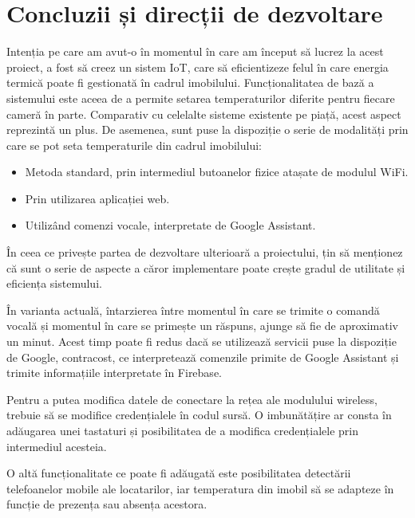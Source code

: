 \chapter{Concluzii și direcții de dezvoltare}\label{ch:5concluzii}

	Intenția pe care am avut-o în momentul în care am început să lucrez la acest proiect, a fost să creez un sistem IoT, care să eficientizeze felul în care energia termică poate fi gestionată în cadrul imobilului. Funcționalitatea de bază a sistemului este aceea de a permite setarea temperaturilor diferite pentru fiecare cameră în parte. Comparativ cu celelalte sisteme existente pe piață, acest aspect reprezintă un plus. De asemenea, sunt puse la dispoziție o serie de modalități prin care se pot seta temperaturile din cadrul imobilului:
	\begin{itemize}
  	\setlength{\itemindent}{2em}
		\itemsep0em
		\item Metoda standard, prin intermediul butoanelor fizice atașate de modulul WiFi.
		\item Prin utilizarea aplicației web.
		\item Utilizând comenzi vocale, interpretate de Google Assistant. 
	\end{itemize} 

\vspace{2em}

	În ceea ce privește partea de dezvoltare ulterioară a proiectului, țin să menționez că sunt o serie de aspecte a căror implementare poate crește gradul de utilitate și eficiența sistemului.

	În varianta actuală, întarzierea între momentul în care se trimite o comandă vocală și momentul în care se primește un răspuns, ajunge să fie de aproximativ un minut. Acest timp poate fi redus dacă se utilizează servicii puse la dispoziție de Google, contracost, ce interpretează comenzile primite de Google Assistant și trimite informațiile interpretate în Firebase. 

	Pentru a putea modifica datele de conectare la rețea ale modulului wireless, trebuie să se modifice credențialele în codul sursă. O imbunătățire ar consta în adăugarea unei tastaturi și posibilitatea de a modifica credențialele prin intermediul acesteia. 

	O altă funcționalitate ce poate fi adăugată este posibilitatea detectării telefoanelor mobile ale locatarilor, iar temperatura din imobil să se adapteze în funcție de prezența sau absența acestora.
	  
